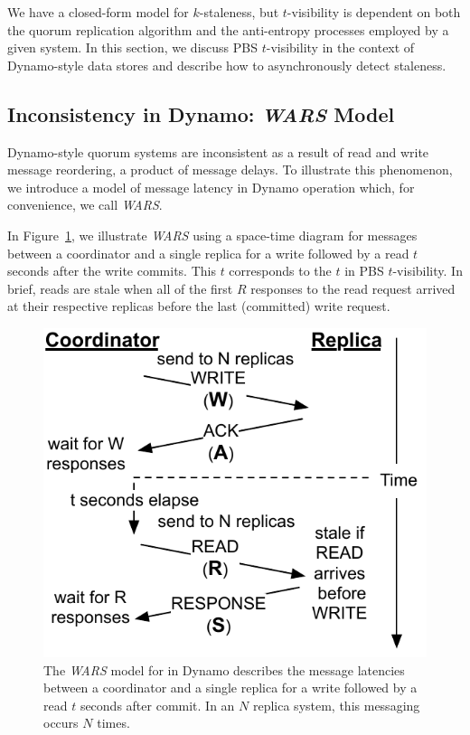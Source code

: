 \documentclass{vldb}
\newcommand{\subsectionskip}{-0em}
\begin{document}
We have a closed-form model for $k$-staleness, but
$t$-visibility is dependent on both the quorum replication algorithm
and the anti-entropy processes employed by a given system.  In this
section, we discuss PBS $t$-visibility in the context of Dynamo-style
data stores and describe how to asynchronously detect
staleness.

\vspace{\subsectionskip}\subsection{Inconsistency in Dynamo: {\large \textit{WARS}} Model}
\label{sec:wars}

Dynamo-style quorum systems are inconsistent as a result of read and
write message reordering, a product of message delays.  To illustrate
this phenomenon, we introduce a model of message latency in Dynamo
operation which, for convenience, we call \textit{WARS}.

In Figure~\ref{fig:dynamo-diagram}, we illustrate \textit{WARS} using
a space-time diagram for messages between a coordinator and a single
replica for a write followed by a read $t$ seconds after the write
commits.  This $t$ corresponds to the $t$ in PBS $t$-visibility. In
brief, reads are stale when all of the first $R$ responses to the read
request arrived at their respective replicas before the last
(committed) write request.

\begin{figure}
\centering
\includegraphics[width=.8\columnwidth]{figs/dynamostale.pdf}
\vspace{-8pt}
\caption{The \textit{WARS} model for in Dynamo describes the message
  latencies between a coordinator and a single replica for a write
  followed by a read $t$ seconds after commit.  In an $N$ replica
  system, this messaging occurs $N$ times.}
\vspace{-12pt}
\label{fig:dynamo-diagram}
\end{figure}
\end{document}
